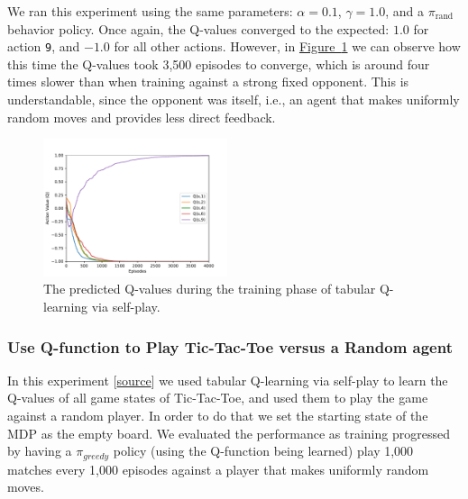 \documentclass{article}
\newcommand{\GithubURL}[1]{[\href{https://github.com/davidrobles/mlnd-capstone-code/blob/master/#1}{source}]}
\begin{document}
We ran this experiment using the same parameters: $\alpha = 0.1$, $\gamma=1.0$, and a
$\pi_{\textrm{rand}}$ behavior policy. Once again, the Q-values converged to the expected: $1.0$ for
action \texttt{9}, and $-1.0$ for all other actions. However, in
\hyperref[fig:tic-ql-tab-simple-selfplay-progress]
{Figure~\ref*{fig:tic-ql-tab-simple-selfplay-progress}} we can observe how this time the Q-values
took 3,500 episodes to converge, which is around four times slower than when training against a
strong fixed opponent. This is understandable, since the opponent was itself, i.e., an agent that
makes uniformly random moves and provides less direct feedback.


\begin{figure}[!b]
    \centering
    \includegraphics[width=0.48\textwidth]{figures/tic_ql_tab_simple_selfplay_progress.pdf}
    \caption{The predicted Q-values during the training phase of tabular Q-learning via self-play.}
    \label{fig:tic-ql-tab-simple-selfplay-progress}
\end{figure}


\subsubsection{Use Q-function to Play Tic-Tac-Toe versus a Random agent}

In this experiment \GithubURL{experiments/tic_ql_tab_full_selfplay.py} we used tabular Q-learning via
self-play to learn the Q-values of all game states of Tic-Tac-Toe, and used them to play the game
against a random player. In order to do that we set the starting state of the MDP as the empty
board. We evaluated the performance as training progressed by having a $\pi_{greedy}$ policy (using
the Q-function being learned) play 1,000 matches every 1,000 episodes against a player that makes
uniformly random moves.
\end{document}
